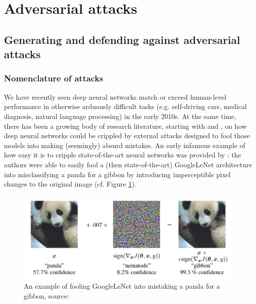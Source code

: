 \newpage
\section{Adversarial attacks}
\label{sec3}

\subsection{Generating and defending against adversarial attacks}

\subsubsection{Nomenclature of attacks}

We have recently seen deep neural networks match or exceed human-level performance in otherwise arduously difficult tasks (e.g. self-driving cars, medical diagnosis, natural language processing) in the early 2010s. At the same time, there has been a growing body of research literature, starting with \cite{Szegedy2014} and \cite{Goodfellow2014}, on how deep neural networks could be crippled by external attacks designed to fool those models into making (seemingly) absurd mistakes. An early infamous example of how easy it is to cripple state-of-the-art neural networks was provided by \cite{Goodfellow2014}: the authors were able to easily fool a (then state-of-the-art) GoogleLeNet architecture into misclassifying a panda for a gibbon by introducing imperceptible pixel changes to the original image (cf. Figure \ref{fig:Adv_001_Fig}).


\vspace{0.2cm}

\begin{figure}[H]
	\centering
	\includegraphics[scale=0.85]{images/adversarial_attacks/Adv_Fig_001_Panda_Picture.PNG}
	\caption{An example of fooling GoogleLeNet into mistaking a panda for a gibbon, source: \cite{Goodfellow2014}}
	\label{fig:Adv_001_Fig}
\end{figure}

